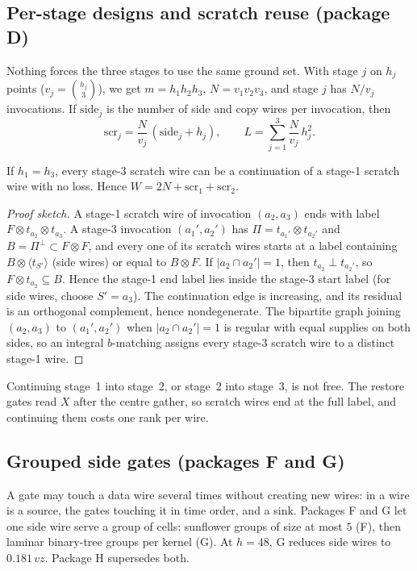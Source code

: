 \subsection{Per-stage designs and scratch reuse (package D)}\label{sec:stages}

Nothing forces the three stages to use the same ground set. With stage $j$ on $h_j$ points ($v_j = \binom{h_j}3$), we get $m = h_1h_2h_3$, $N = v_1v_2v_3$, and stage $j$ has $N/v_j$ invocations. If $\mathrm{side}_j$ is the number of side and copy wires per invocation, then
\[
\mathrm{scr}_j = \frac{N}{v_j}\,(\mathrm{side}_j + h_j), \qquad L = \sum_{j=1}^3 \frac{N}{v_j}\,h_j^2 .
\]

\begin{lemma}\label{lem:reuse}
If $h_1 = h_3$, every stage-3 scratch wire can be a continuation of a stage-1 scratch wire with no loss. Hence $W = 2N + \mathrm{scr}_1 + \mathrm{scr}_2$.
\end{lemma}

\begin{proof}[Proof sketch]
A stage-1 scratch wire of invocation $(a_2,a_3)$ ends with label $F\otimes t_{a_2}\otimes t_{a_3}$. A stage-3 invocation $(a_1',a_2')$ has $\Pi = t_{a_1'}\otimes t_{a_2'}$ and $B = \Pi^\perp\subset F\otimes F$, and every one of its scratch wires starts at a label containing $B\otimes\langle t_{S'}\rangle$ (side wires) or equal to $B\otimes F$. If $|a_2\cap a_2'| = 1$, then $t_{a_2}\perp t_{a_2'}$, so $F\otimes t_{a_2}\subseteq B$. Hence the stage-1 end label lies inside the stage-3 start label (for side wires, choose $S' = a_3$). The continuation edge is increasing, and its residual is an orthogonal complement, hence nondegenerate. The bipartite graph joining $(a_2,a_3)$ to $(a_1',a_2')$ when $|a_2\cap a_2'| = 1$ is regular with equal supplies on both sides, so an integral $b$-matching assigns every stage-3 scratch wire to a distinct stage-1 wire.
\end{proof}

Continuing stage~1 into stage~2, or stage~2 into stage~3, is not free. The restore gates read $X$ after the centre gather, so scratch wires end at the full label, and continuing them costs one rank per wire.

\subsection{Grouped side gates (packages F and G)}

A gate may touch a data wire several times without creating new wires: in \cite{OAI} a wire is a source, the gates touching it in time order, and a sink. Packages F and G let one side wire serve a group of cells: sunflower groups of size at most $5$ (F), then laminar binary-tree groups per kernel (G). At $h = 48$, G reduces side wires to $0.181\,vz$. Package H supersedes both.

